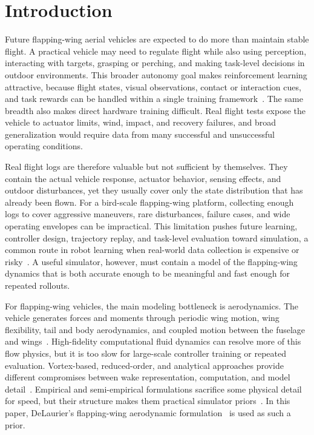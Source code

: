 \section{Introduction}
\label{sec:introduction}

Future flapping-wing aerial vehicles are expected to do more than maintain stable flight. A practical vehicle may need to regulate flight while also using perception, interacting with targets, grasping or perching, and making task-level decisions in outdoor environments. This broader autonomy goal makes reinforcement learning attractive, because flight states, visual observations, contact or interaction cues, and task rewards can be handled within a single training framework~\cite{kober2013rlsurvey}. The same breadth also makes direct hardware training difficult. Real flight tests expose the vehicle to actuator limits, wind, impact, and recovery failures, and broad generalization would require data from many successful and unsuccessful operating conditions.

Real flight logs are therefore valuable but not sufficient by themselves. They contain the actual vehicle response, actuator behavior, sensing effects, and outdoor disturbances, yet they usually cover only the state distribution that has already been flown. For a bird-scale flapping-wing platform, collecting enough logs to cover aggressive maneuvers, rare disturbances, failure cases, and wide operating envelopes can be impractical. This limitation pushes future learning, controller design, trajectory replay, and task-level evaluation toward simulation, a common route in robot learning when real-world data collection is expensive or risky~\cite{muratore2022randomized_simulations}. A useful simulator, however, must contain a model of the flapping-wing dynamics that is both accurate enough to be meaningful and fast enough for repeated rollouts.

For flapping-wing vehicles, the main modeling bottleneck is aerodynamics. The vehicle generates forces and moments through periodic wing motion, wing flexibility, tail and body aerodynamics, and coupled motion between the fuselage and wings~\cite{shyy2010recent}. High-fidelity computational fluid dynamics can resolve more of this flow physics, but it is too slow for large-scale controller training or repeated evaluation. Vortex-based, reduced-order, and analytical approaches provide different compromises between wake representation, computation, and model detail~\cite{valdez2020comparative}. Empirical and semi-empirical formulations sacrifice some physical detail for speed, but their structure makes them practical simulator priors~\cite{wang2016}. In this paper, DeLaurier's flapping-wing aerodynamic formulation~\cite{delaurier1993} is used as such a prior.

